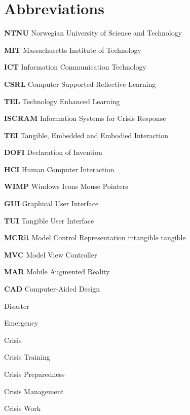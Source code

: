 \chapter{Abbreviations}\label{abbreviations}

\textbf{NTNU} Norwegian University of Science and Technology

\textbf{MIT} Massachusetts Institute of Technology

\textbf{ICT} Information Communication Technology

\textbf{CSRL} Computer Supported Reflective Learning

\textbf{TEL} Technology Enhanced Learning

\textbf{ISCRAM} Information Systems for Crisis Response

\textbf{TEI} Tangible, Embedded and Embodied Interaction

\textbf{DOFI} Declaration of Invention

\textbf{HCI} Human Computer Interaction

\textbf{WIMP} Windows Icons Mouse Pointers

\textbf{GUI} Graphical User Interface

\textbf{TUI} Tangible User Interface

\textbf{MCRit} Model Control Representation intangible tangible

\textbf{MVC} Model View Controller

\textbf{MAR} Mobile Augmented Reality

\textbf{CAD} Computer-Aided Design

Disaster

Emergency

Crisis

Crisis Training

Crisis Preparedness

Crisis Management

Crisis Work
